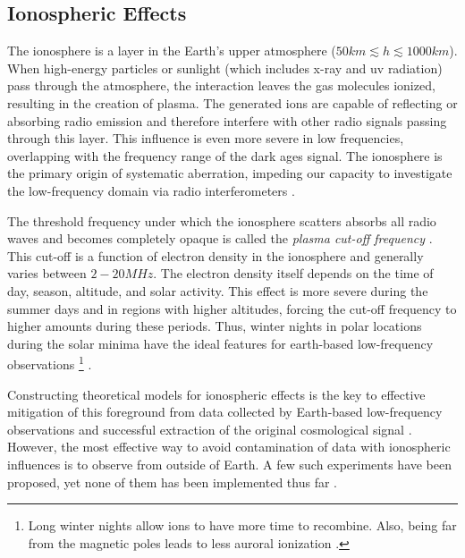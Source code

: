 \documentclass[12pt, TexShade, letterpaper]{report}
\begin{document}
\subsection{Ionospheric Effects}
The ionosphere is a layer in the Earth's upper atmosphere ($50km \lesssim h \lesssim 1000 km$). When high-energy particles or sunlight (which includes x-ray and \gls{uv} radiation) pass through the atmosphere, the interaction leaves the gas molecules ionized, resulting in the creation of plasma. The generated ions are capable of reflecting or absorbing radio emission and therefore interfere with other radio signals passing through this layer. This influence is even more severe in low frequencies, overlapping with the frequency range of the dark ages signal. The ionosphere is the primary origin of systematic aberration, impeding our capacity to investigate the low-frequency domain via radio interferometers \cite{thesis_pamela, ionosphere_ultra_low}.\par
The threshold frequency under which the ionosphere scatters absorbs all radio waves and becomes completely opaque is called the \emph{plasma cut-off frequency} \cite{ionosphere_effect_book, thesis_pamela}. This cut-off is a function of electron density in the ionosphere and generally varies between $2-20MHz$. The electron density itself depends on the time of day, season, altitude, and solar activity. This effect is more severe during the summer days and in regions with higher altitudes, forcing the cut-off frequency to higher amounts during these periods. Thus, winter nights in polar locations during the solar minima have the ideal features for earth-based low-frequency observations \footnote{Long winter nights allow ions to have more time to recombine. Also, being far from the magnetic poles leads to less auroral ionization \cite{prizm_thesis}.} \cite{thesis_pamela}.\par
Constructing theoretical models for ionospheric effects is the key to effective mitigation of this foreground from data collected by Earth-based low-frequency observations and successful extraction of the original cosmological signal \cite{ionosphere_model, ionosphere_Bayesian}. However, the most effective way to avoid contamination of data with ionospheric influences is to observe from outside of Earth\cite{thesis_shedding}. A few such experiments have been proposed, yet none of them has been implemented thus far \cite{dare_1, dare_2, 21cm_space_interferometer, lunar_orbit_21cm}. \par
\end{document}
